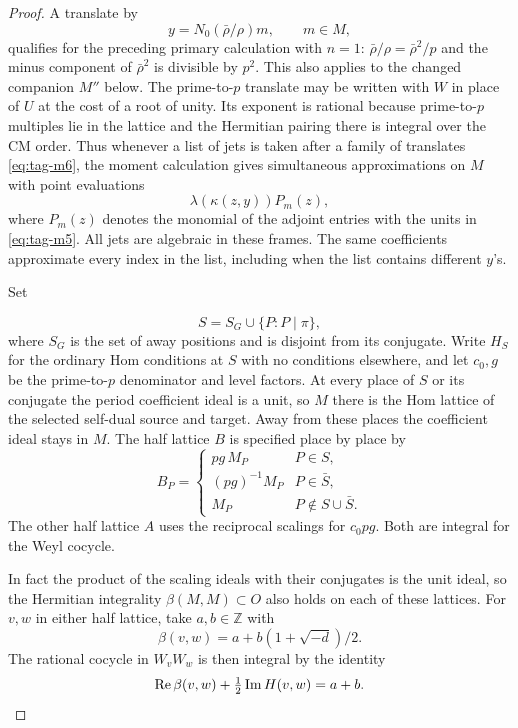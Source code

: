 \begin{proof}

A translate by
\[
                        y=N_0(\bar\rho/\rho)m,\qquad m\in M,
\tag{M6}\label{eq:tag-m6}
\]
qualifies for the preceding primary calculation with
\(n=1\): \(\bar\rho/\rho=\bar\rho^2/p\) and
the minus component of \(\bar\rho^2\) is divisible by
\(p^2\). This also applies to the changed companion
\(M''\) below. The prime-to-\(p\) translate may be
written with \(W\) in place of \(U\) at the cost of a
root of unity. Its exponent is rational because prime-to-\(p\)
multiples lie in the lattice and the Hermitian pairing
there is integral over the CM order. Thus whenever
a list of jets is taken after a family of translates
\eqref{eq:tag-m6}, the moment calculation gives simultaneous
approximations on \(M\) with point evaluations
\[
                      \lambda(\kappa(z,y))P_m(z),
\tag{M7}\label{eq:tag-m7}
\]
where \(P_m(z)\) denotes the monomial of the adjoint
entries with the units in \eqref{eq:tag-m5}. All jets are algebraic
in these frames. The same coefficients approximate
every index in the list, including when the list
contains different \(y\)'s.


Set

\[
  S=S_G\cup\{P:P\mid\pi\},
\]
 where \(S_G\) is the set
of away positions and is disjoint from its conjugate.
Write \(H_S\) for the ordinary Hom conditions at \(S\)
with no conditions elsewhere, and let \(c_0,g\) be the
prime-to-\(p\) denominator and level factors. At every
place of \(S\) or its conjugate the period coefficient
ideal is a unit, so \(M\) there is the Hom lattice of
the selected self-dual source and target. Away from these
places the coefficient ideal stays in \(M\).
The half lattice \(B\) is specified place by place by
\[
  B_P=\begin{cases}pg\,M_P&P\in S,\\ (pg)^{-1}M_P&P\in\bar S,\\ M_P&P\notin S\cup\bar S.\end{cases}
\]
The other half lattice \(A\) uses the reciprocal scalings for \(c_0pg\).
Both are integral for the Weyl cocycle.

In fact the
product of the scaling ideals with their conjugates is
the unit ideal, so the Hermitian integrality
\(\beta(M,M)\subset O\) also holds on each of these
lattices. For \(v,w\) in either half lattice, take \(a,b\in\mathbb Z\)
with 
\[
  \beta(v,w)=a+b(1+\sqrt{-d})/2.
\]
 The rational cocycle in
\(W_v W_w\) is then integral by the identity
\[
             \operatorname{Re}\beta(v,w)+\tfrac12\operatorname{Im}H(v,w)=a+b.
\]


\end{proof}
